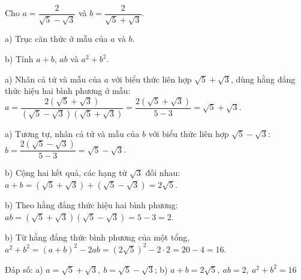 \begin{problem}[9DS-CAN-027]
Cho $a = \dfrac{2}{\sqrt{5} - \sqrt{3}}$ và $b = \dfrac{2}{\sqrt{5} + \sqrt{3}}$.

a) Trục căn thức ở mẫu của $a$ và $b$.

b) Tính $a + b$, $ab$ và $a^2 + b^2$.

\begin{solution}
a) Nhân cả tử và mẫu của $a$ với biểu thức liên hợp $\sqrt{5} + \sqrt{3}$, dùng hằng đẳng thức hiệu hai bình phương ở mẫu: $a = \dfrac{2(\sqrt{5} + \sqrt{3})}{(\sqrt{5} - \sqrt{3})(\sqrt{5} + \sqrt{3})} = \dfrac{2(\sqrt{5} + \sqrt{3})}{5 - 3} = \sqrt{5} + \sqrt{3}$.

a) Tương tự, nhân cả tử và mẫu của $b$ với biểu thức liên hợp $\sqrt{5} - \sqrt{3}$: $b = \dfrac{2(\sqrt{5} - \sqrt{3})}{5 - 3} = \sqrt{5} - \sqrt{3}$.

b) Cộng hai kết quả, các hạng tử $\sqrt{3}$ đối nhau: $a + b = (\sqrt{5} + \sqrt{3}) + (\sqrt{5} - \sqrt{3}) = 2\sqrt{5}$.

b) Theo hằng đẳng thức hiệu hai bình phương: $ab = (\sqrt{5} + \sqrt{3})(\sqrt{5} - \sqrt{3}) = 5 - 3 = 2$.

b) Từ hằng đẳng thức bình phương của một tổng, $a^2 + b^2 = (a + b)^2 - 2ab = (2\sqrt{5})^2 - 2 \cdot 2 = 20 - 4 = 16$.

Đáp số: a) $\boxed{a = \sqrt{5} + \sqrt{3},\ b = \sqrt{5} - \sqrt{3}}$; b) $\boxed{a + b = 2\sqrt{5},\ ab = 2,\ a^2 + b^2 = 16}$
\end{solution}
\end{problem}

